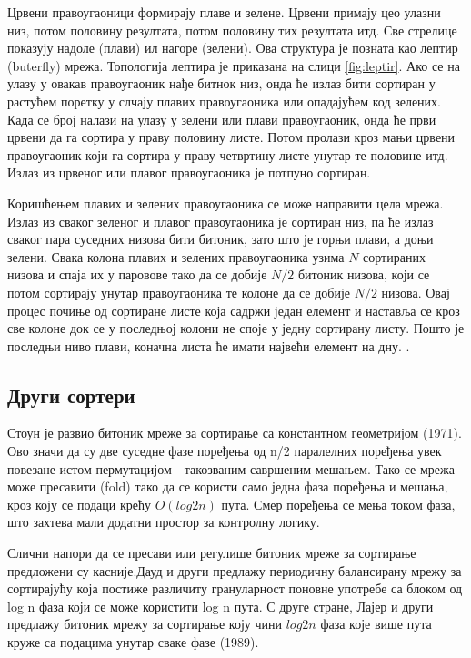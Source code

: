 \documentclass[12pt, a4paper]{article}
\theoremstyle{definition}
\begin{document}
Црвени правоугаоници формирају плаве и зелене. Црвени примају цео улазни низ, потом половину резултата, потом половину тих резултата итд. Све стрелице показују надоле (плави) ил нагоре (зелени). Ова структура је позната као лептир (buterfly) мрежа. Топологија лептира је приказана на слици \ref{fig:leptir}. Ако се на улазу у овакав правоугаоник нађе битнок низ, онда ће излаз бити сортиран у растућем поретку у слчају плавих правоугаоника или опадајућем код зелених. Када се број налази на улазу у зелени или плави правоугаоник, онда ће први црвени да га сортира у праву половину листе. Потом пролази кроз мањи црвени правоугаоник који га сортира у праву четвртину листе унутар те половине итд. Излаз из црвеног или плавог правоугаоника је потпуно сортиран.

Коришћењем плавих и зелених правоугаоника се може направити цела мрежа. Излаз из сваког зеленог и плавог правоугаоника је сортиран низ, па ће излаз сваког пара суседних низова бити битоник, зато што је горњи плави, а доњи зелени. Свака колона плавих и зелених правоугаоника узима $N$ сортираних низова и спаја их у паровове тако да се добије $N/2$ битоник низова, који се потом сортирају унутар правоугаоника те колоне да се добије $N/2$ низова. Овај процес почиње од сортиране листе која садржи један елемент и наставља се кроз све колоне док се у последњој колони не споје у једну сортирану листу. Пошто је последњи ниво плави, коначна листа ће имати највећи елемент на дну. \cite{wiki_bitonic}.

\subsection{Други сортери}
Стоун \cite{stone} је развио битоник мреже за сортирање са константном геометријом (1971). Ово значи да су две суседне фазе поређења од n/2 паралелних поређења увек повезане истом пермутацијом - такозваним савршеним мешањем. Тако се мрежа може пресавити (fold) тако да се користи само једна фаза поређења и мешања, кроз коју се подаци крећу $O(log2 n)$ пута. Смер поређења се мења током фаза, што захтева мали додатни простор за контролну логику.

Слични напори да се пресави или регулише битоник мреже за сортирање предложени су касније.Дауд и други \cite{dowd} предлажу периодичну балансирану мрежу за сортирајућу која постиже различиту грануларност поновне употребе са блоком од log n фаза који се може користити log n пута. С друге стране, Лајер и други \cite{layer07} предлажу битоник мрежу за сортирање коју чини $log2 n$ фаза које више пута круже са подацима унутар сваке фазе (1989).
\end{document}
